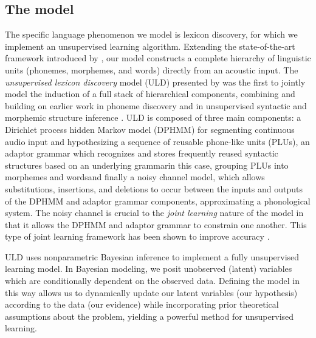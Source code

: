 \documentclass[12pt,letterpaper]{article}
\begin{document}
\subsection{The model}
The specific language phenomenon we model is lexicon discovery, for which we implement an unsupervised learning algorithm. Extending the state-of-the-art framework introduced by \citet{lee:2015}, our model constructs a complete hierarchy of linguistic units (phonemes, morphemes, and words) directly from an acoustic input. The \textit{unsupervised lexicon discovery} model (ULD) presented by \citet{lee:2015} was the first to jointly model the induction of a full stack of hierarchical components, combining and building on earlier work in phoneme discovery \citep{lee:2012} and in unsupervised syntactic \citep{johnson:2007} and morphemic structure inference \citep{odonnell:2015} . ULD is composed of three main components: a Dirichlet process hidden Markov model (DPHMM) \citep{lee:2012} for segmenting continuous audio input and hypothesizing a sequence of reusable phone-like units (PLUs), an adaptor grammar \citep{johnson:2007} which recognizes and stores frequently reused syntactic structures based on an underlying grammar\textemdash in this case, grouping PLUs into morphemes and words\textemdash and finally a noisy channel model, which allows substitutions, insertions, and deletions to occur between the inputs and outputs of the DPHMM and adaptor grammar components, approximating a phonological system. The noisy channel is crucial to the \textit{joint learning} nature of the model in that it allows the DPHMM and adaptor grammar to constrain one another. This type of joint learning framework has been shown to improve accuracy \citep{johnson:2008}. 

ULD uses nonparametric Bayesian inference to implement a fully unsupervised learning model. In Bayesian modeling, we posit unobserved (latent) variables which are conditionally dependent on the observed data. Defining the model in this way allows us to dynamically update our latent variables (our hypothesis) according to the data (our evidence) while incorporating prior theoretical assumptions about the problem, yielding a powerful method for unsupervised learning. 
\end{document}
